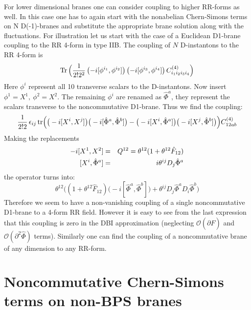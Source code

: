 \documentclass[a4paper,a4paper]{amsproc}
\theoremstyle{definition}
\theoremstyle{remark}
\numberwithin{equation}{section}
\begin{document}
%
For lower dimensional branes one can consider coupling to higher
RR-forms as well. In this case one has to again start with the
nonabelian Chern-Simons terms on N D(-1)-branes and substitute the
appropriate brane solution along with the fluctuations. For
illustration let us start with the case of a Euclidean D1-brane
coupling to the RR 4-form in type IIB. The coupling of $N$
D-instantons to the RR 4-form is
%
\begin{equation}
\hbox{Tr}\,\Big( {\frac{1}{ 2! 2^2}}\left(-i[\phi^{i_1},\phi^{i_2}]\right)
\left(-i[\phi^{i_3},\phi^{i_4}]\right) C^{(4)}_{i_1 i_2 i_3 i_4}
\Big)
\end{equation}
%
Here $\phi^i$ represent all 10 transverse scalars to the
D-instantons. Now insert $\phi^1=X^1,~\phi^2=X^2$. The remaining
$\phi^i$ are renamed as $\hat{\Phi}^a$, they represent the scalars
transverse to the noncommutative D1-brane. Thus we find the coupling:
%
\begin{equation}
\frac{1}{2! 2}\,\epsilon_{ij}\,\hbox{tr}\Big(
\big(-i[X^i,X^j]\big) \big(-i[\hat{\Phi}^a,\hat{\Phi}^b]\big)
- \big(-i[X^i,\hat{\Phi}^a]\big) \big(-i[X^j,\hat{\Phi}^b]\big)\Big)
C^{(4)}_{12ab} 
\end{equation}
%
Making the replacements
%
\begin{eqnarray}
-i[X^1,X^2] &=& Q^{12} = \theta^{12}(1+\theta^{12}\hat F_{12})\cr 
[X^i,\hat{\Phi}^a] &=& i\theta^{ij} D_j\hat{\Phi}^a\cr
\end{eqnarray}
%
the operator turns into:
%
\begin{equation}
\theta^{12}\Big( (1+\theta^{12}\hat
F_{12})\big(-i[\hat{\Phi}^a,\hat{\Phi}^b]
\big) + \theta^{ij}D_j\hat{\Phi}^a D_i\hat{\Phi}^b \Big) 
\end{equation}
%
Therefore we seem to have a non-vanishing coupling of a single
noncommutative D1-brane to a 4-form RR field. However it is easy to
see from the last expression that this coupling is zero in the DBI
approximation (neglecting ${\mathcal O}(\partial \hat F)$ and
${\mathcal O}(\partial^2 \hat \Phi)$ terms). Similarly one can find
the coupling of a noncommutative brane of any dimension to any RR-form. 

\section{Noncommutative Chern-Simons terms on non-BPS branes}
\end{document}
